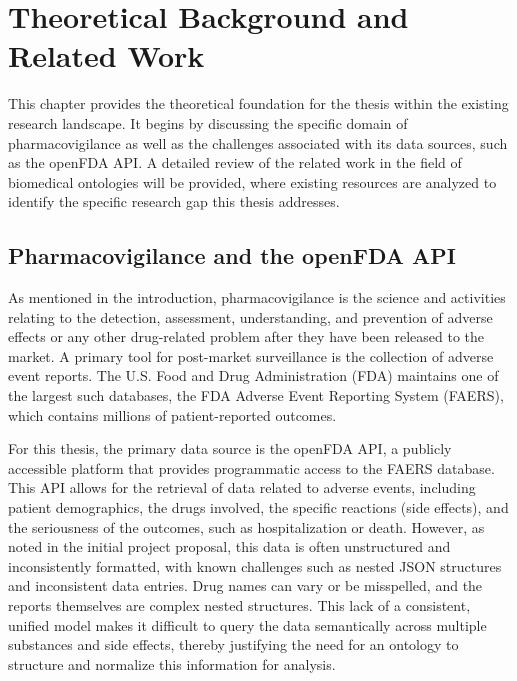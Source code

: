 \section{Theoretical Background and Related Work}
This chapter provides the theoretical foundation for the thesis within the existing research landscape. It begins by discussing the specific domain of pharmacovigilance as well as the challenges associated with its data sources, such as the openFDA API. A detailed review of the related work in the field of biomedical ontologies will be provided, where existing resources are analyzed to identify the specific research gap this thesis addresses.
\subsection{Pharmacovigilance and the openFDA API}
As mentioned in the introduction, pharmacovigilance is the science and activities relating to the detection, assessment, understanding, and prevention of adverse effects or any other drug-related problem after they have been released to the market. A primary tool for post-market surveillance is the collection of adverse event reports. The U.S. Food and Drug Administration (FDA) maintains one of the largest such databases, the FDA Adverse Event Reporting System (FAERS), which contains millions of patient-reported outcomes. 

For this thesis, the primary data source is the openFDA API, a publicly accessible platform that provides programmatic access to the FAERS database. This API allows for the retrieval of data related to adverse events, including patient demographics, the drugs involved, the specific reactions (side effects), and the seriousness of the outcomes, such as hospitalization or death. However, as noted in the initial project proposal, this data is often unstructured and inconsistently formatted, with known challenges such as nested JSON structures and inconsistent data entries. Drug names can vary or be misspelled, and the reports themselves are complex nested structures. This lack of a consistent, unified model makes it difficult to query the data semantically across multiple substances and side effects, thereby justifying the need for an ontology to structure and normalize this information for analysis.
